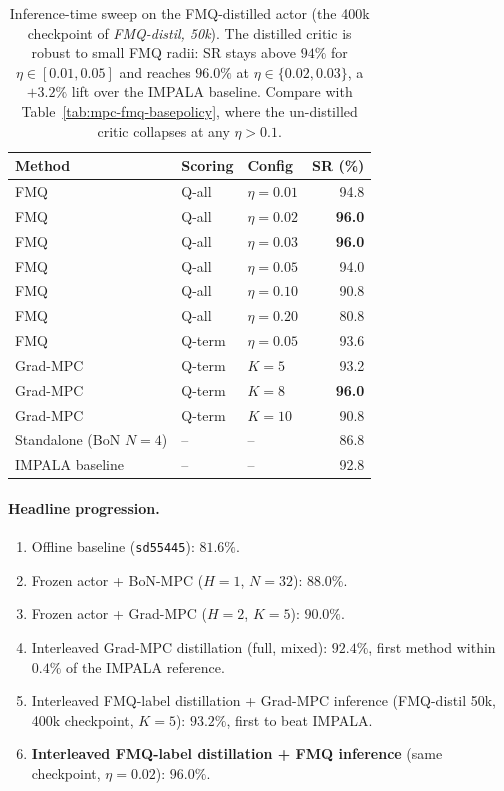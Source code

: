 \begin{table}[h]
\centering
\caption{Inference-time sweep on the FMQ-distilled actor (the 400k checkpoint of \emph{FMQ-distil, 50k}). The distilled critic is robust to small FMQ radii: SR stays above $94\%$
   for $\eta \in [0.01, 0.05]$ and reaches $96.0\%$ at $\eta \in \{0.02, 0.03\}$, a $+3.2\%$ lift over the IMPALA baseline. Compare with
   Table~\ref{tab:mpc-fmq-basepolicy}, where the un-distilled critic collapses at any $\eta > 0.1$.}
\label{tab:mpc-fmq-distilled}
\begin{tabular}{l l l r}
\toprule
Method & Scoring & Config & SR (\%) \\
\midrule
FMQ      & Q-all  & $\eta = 0.01$ & 94.8 \\
FMQ      & Q-all  & $\eta = 0.02$ & \textbf{96.0} \\
FMQ      & Q-all  & $\eta = 0.03$ & \textbf{96.0} \\
FMQ      & Q-all  & $\eta = 0.05$ & 94.0 \\
FMQ      & Q-all  & $\eta = 0.10$ & 90.8 \\
FMQ      & Q-all  & $\eta = 0.20$ & 80.8 \\
FMQ      & Q-term & $\eta = 0.05$ & 93.6 \\
\midrule
Grad-MPC & Q-term & $K = 5$       & 93.2 \\
Grad-MPC & Q-term & $K = 8$       & \textbf{96.0} \\
Grad-MPC & Q-term & $K = 10$      & 90.8 \\
\midrule
Standalone (BoN $N = 4$) & -- & -- & 86.8 \\
IMPALA baseline          & -- & -- & 92.8 \\
\bottomrule
\end{tabular}
\end{table}

\paragraph{Headline progression.}
\begin{enumerate}
    \item Offline baseline (\texttt{sd55445}): $81.6\%$.
    \item Frozen actor + BoN-MPC ($H = 1$, $N = 32$): $88.0\%$.
    \item Frozen actor + Grad-MPC ($H = 2$, $K = 5$): $90.0\%$.
    \item Interleaved Grad-MPC distillation (full, mixed): $92.4\%$, first method within $0.4\%$ of the IMPALA reference.
    \item Interleaved FMQ-label distillation + Grad-MPC inference (FMQ-distil 50k, 400k checkpoint, $K = 5$): $93.2\%$, first to beat IMPALA.
    \item \textbf{Interleaved FMQ-label distillation + FMQ inference} (same checkpoint, $\eta = 0.02$): \textbf{$96.0\%$}.
\end{enumerate}

